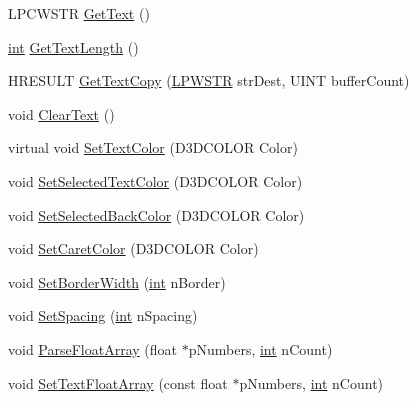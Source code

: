 \begin{DoxyCompactItemize}
\item 
LPCWSTR \hyperlink{class_c_d_x_u_t_edit_box_a7d20deae894a3a0259a2e9fca551371d}{GetText} ()
\item 
\hyperlink{_d_x_u_tgui_8cpp_a2d77ed03302b6978834ee3b6f57837fb}{int} \hyperlink{class_c_d_x_u_t_edit_box_a2bb1d1ebe99c30ef317824e852882126}{GetTextLength} ()
\item 
HRESULT \hyperlink{class_c_d_x_u_t_edit_box_aa1b4a760e28f3176c18bd635c88525f5}{GetTextCopy} (\hyperlink{_d_x_u_tgui_8cpp_a6ad64a19933213d15128e5fcd09bc1a6}{LPWSTR} strDest, UINT bufferCount)
\item 
void \hyperlink{class_c_d_x_u_t_edit_box_a769bc1130895f3d116b45a4f25bc3b78}{ClearText} ()
\item 
virtual void \hyperlink{class_c_d_x_u_t_edit_box_a7240aa451e6662077671f754f331edfa}{SetTextColor} (D3DCOLOR Color)
\item 
void \hyperlink{class_c_d_x_u_t_edit_box_a44d55aa688bac6e18ea8b86f8707b9b8}{SetSelectedTextColor} (D3DCOLOR Color)
\item 
void \hyperlink{class_c_d_x_u_t_edit_box_ae43b2c8142d3ce9602ae73193b0982fe}{SetSelectedBackColor} (D3DCOLOR Color)
\item 
void \hyperlink{class_c_d_x_u_t_edit_box_afb8d2b7593862e875daf4b4a63080ddf}{SetCaretColor} (D3DCOLOR Color)
\item 
void \hyperlink{class_c_d_x_u_t_edit_box_af9b5c04a9cdda81761cc04d7e70a6a06}{SetBorderWidth} (\hyperlink{_d_x_u_tgui_8cpp_a2d77ed03302b6978834ee3b6f57837fb}{int} nBorder)
\item 
void \hyperlink{class_c_d_x_u_t_edit_box_ada1e5253fd1df390a9536cd111ed0121}{SetSpacing} (\hyperlink{_d_x_u_tgui_8cpp_a2d77ed03302b6978834ee3b6f57837fb}{int} nSpacing)
\item 
void \hyperlink{class_c_d_x_u_t_edit_box_a7a3810c8c3ee8f44a87451fd0d3ce127}{ParseFloatArray} (float $\ast$pNumbers, \hyperlink{_d_x_u_tgui_8cpp_a2d77ed03302b6978834ee3b6f57837fb}{int} nCount)
\item 
void \hyperlink{class_c_d_x_u_t_edit_box_a97571e11cb7c2a19e3cf35239a8ff44e}{SetTextFloatArray} (const float $\ast$pNumbers, \hyperlink{_d_x_u_tgui_8cpp_a2d77ed03302b6978834ee3b6f57837fb}{int} nCount)
\end{DoxyCompactItemize}

